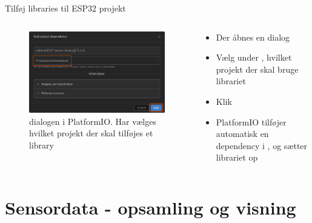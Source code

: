 \documentclass[aspectratio=169]{beamer}
\begin{document}
\begin{frame}{Tilføj libraries til ESP32 projekt}
\begin{columns}
	\begin{column}{0.5\textwidth}
		\begin{figure}
  			\includegraphics[width=\textwidth,keepaspectratio=true]{assets/pictures/pio-libraries-3.png}
  			\caption{ dialogen i PlatformIO. Har vælges hvilket projekt der skal tilføjes et library}
  			\label{fig:pio-libraries-3}
		\end{figure}
	\end{column}
	\begin{column}{0.5\textwidth}
		\begin{textBox}
			\begin{itemize}
				\item Der åbnes en  dialog
				\item Vælg under , hvilket projekt der skal bruge librariet
				\item Klik 
				\item PlatformIO tilføjer automatisk en  dependency i , og sætter librariet op
			\end{itemize}
		\end{textBox}
	\end{column}
\end{columns}
\end{frame}

\section{Sensordata - opsamling og visning}
\begin{frame}
\end{frame}
\end{document}
